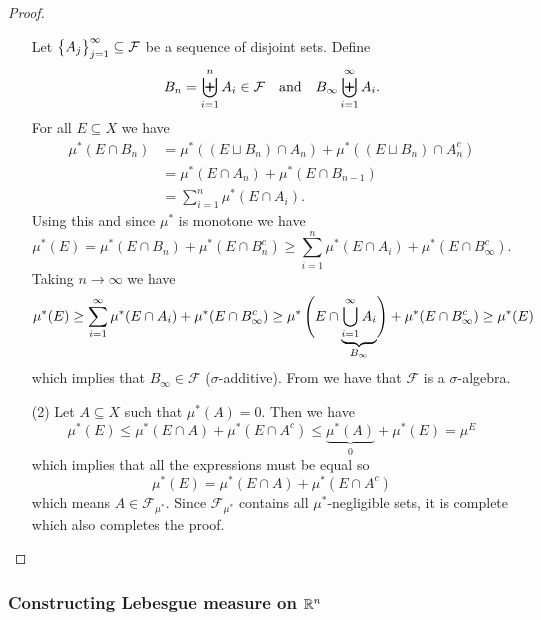 \documentclass[11pt,a4paper]{article}
\begin{document}
\begin{proof}
\begin{enumerate}
  Let $\set{A_j}_{j=1}^{\infty} \subseteq \mathcal F$ be a sequence of
  disjoint sets.
  Define
  \[
    B_n = \biguplus_{i=1}^{n} A_i \in \mathcal F \quad \text{and} \quad
    B_{\infty} \biguplus_{i=1}^{\infty} A_i.
  \]
  For all $E \subseteq X$ we have
  \begin{align*}
    \mu^*(E \cap B_n) &= 
    \mu^*((E \sqcup B_n) \cap A_n) +
    \mu^*((E \sqcup B_n) \cap A_n^c) \\ &=
    \mu^*(E \cap A_n) + \mu^*(E \cap B_{n-1}) \\ &=
    \sum_{i=1}^{n} \mu^*(E \cap A_i).
  \end{align*}
  Using this and since $\mu^*$ is monotone we have
  \[
    \mu^*(E) =
    \mu^*(E \cap B_n) + \mu^*(E \cap B_n^c) \geq
    \sum_{i=1}^{n} \mu^*(E \cap A_i) + \mu^*(E \cap B_{\infty}^c).
  \]
  Taking $n \to \infty$ we have
  \[
    \mu^*(E) \geq
    \sum_{i=1}^{\infty} \mu^*(E \cap A_i) + \mu^*(E \cap B_{\infty}^c) \geq
    \mu^*\del[4]{E \cap \underbrace{\bigcup_{i=1}^{\infty} A_i}_{B_{\infty}}}   
    + \mu^*(E \cap B_{\infty}^c) \geq
    \mu^*(E)
  \]
  which implies that $B_{\infty} \in \mathcal F$ ($\sigma$-additive).
  From  we have that $\mathcal F$ is a $\sigma$-algebra.
  \item[(2)] Let $A \subseteq X$ such that $\mu^*(A) = 0$.
  Then we have
  \[
    \mu^*(E) \le
    \mu^*(E \cap A) + \mu^*(E \cap A^c) \le
    \underbrace{\mu^*(A)}_{0} + \mu^*(E) =
    \mu^{E}
  \]
  which implies that all the expressions must be equal so
  \[
    \mu^*(E) =
    \mu^*(E \cap A) + \mu^*(E \cap A^c)
  \]
  which means $A \in \mathcal F_{\mu^*}$.
  Since $\mathcal F_{\mu^*}$ contains all $\mu^*$-negligible sets, it is
  complete which also completes the proof.
\end{enumerate}
\end{proof}

\subsubsection{Constructing Lebesgue measure on \texorpdfstring{$\mathbb{R}^n$}{Rn}}
\end{document}
